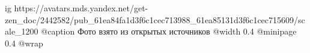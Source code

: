  
 
 
 
 

\ifcmt
  ig https://avatars.mds.yandex.net/get-zen_doc/2442582/pub_61ea84fa1d3f6c1cec713988_61ea85131d3f6c1cec715609/scale_1200
  @caption Фото взято из открытых источников
  @width 0.4
  @minipage 0.4
  @wrap \parpic[r]
\fi
